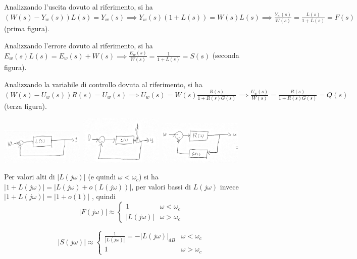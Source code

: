 \documentclass[answers, a4paper, 11pt]{exam}
\begin{document}
\begin{questions}
\begin{parts}
\begin{solution}
{}

Analizzando l'uscita dovuto al riferimento, si ha $(W(s) - Y_w(s)) L(s) = Y_w (s) 
\implies Y_w(s) (1 + L(s)) = W(s) L(s) 
\implies \frac{Y_w(s)}{W(s)} = \frac{L(s)}{1 + L(s)} = F(s)$ (prima figura).

Analizzando l'errore dovuto al riferimento, si ha $E_w(s) L(s) = E_w (s) + W(s) 
\implies \frac{E_w(s)}{W(s)} = \frac{1}{1 + L(s)} = S(s)$ (seconda figura).

Analizzando la variabile di controllo dovuta al riferimento, si ha $(W(s) - U_w(s)) R(s) = U_w(s) 
\implies U_w(s) = W(s) \frac{R(s)}{1 + R(s) G(s)} 
\implies \frac{U_w (s)}{W(s)} = \frac{R(s)}{1 + R(s) G(s)} = Q(s)$ (terza figura).

{

\centering
\includegraphics[width=0.3\textwidth]{F}
\includegraphics[width=0.3\textwidth]{S}
\includegraphics[width=0.3\textwidth]{Q}

}

Per valori alti di $|L(j\omega)|$ (e quindi $\omega < \omega_c$) si ha $|1 + L(j\omega)| = |L(j\omega) + o(L(j\omega))|$, per valori bassi di $L(j\omega)$ invece $|1 + L(j\omega)| = |1 + o(1)|$ , quindi 
\begin{equation}
    |F(j\omega)| \approx 
    \begin{cases}
1 & \omega < \omega_c \\ |L(j\omega)| & \omega > \omega_c
\end{cases}
\end{equation}

\begin{equation}
|S(j\omega)| \approx 
\begin{cases}\frac{1}{|L(j\omega)|} = -|L(j\omega)|_{dB} & \omega < \omega_c \\
1 & \omega > \omega_c
\end{cases}
\end{equation}


\end{solution}
\end{parts}
\end{questions}
\end{document}

